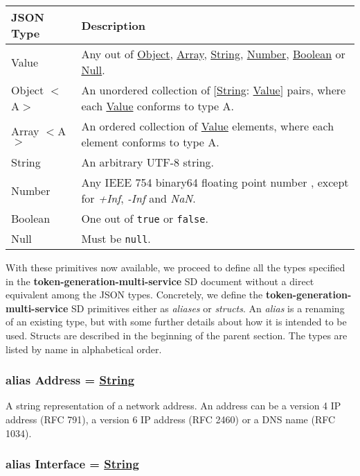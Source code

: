 \documentclass[a4paper]{arrowhead}
\newcommand{\pdef}[1]{{\textcolor{ArrowheadGrey}{#1 \label{sec:model:primitives:#1} \label{sec:model:primitives:#1s}}}}
\newcommand{\pref}[1]{{\textcolor{ArrowheadGrey}{\hyperref[sec:model:primitives:#1]{#1}}}}
\begin{document}
\clearpage

\begin{table}[ht!]
\begin{tabularx}{\textwidth}{| p{3cm} | X |} \hline
\rowcolor{gray!33} JSON Type & Description \\ \hline
\pdef{Value}                 & Any out of \pref{Object}, \pref{Array}, \pref{String}, \pref{Number}, \pref{Boolean} or \pref{Null}. \\ \hline
\pdef{Object}$<$A$>$         & An unordered collection of $[$\pref{String}: \pref{Value}$]$ pairs, where each \pref{Value} conforms to type A. \\ \hline
\pdef{Array}$<$A$>$          & An ordered collection of \pref{Value} elements, where each element conforms to type A. \\ \hline
\pdef{String}                & An arbitrary UTF-8 string. \\ \hline
\pdef{Number}                & Any IEEE 754 binary64 floating point number \cite{cowlishaw2019floating}, except for \textit{+Inf}, \textit{-Inf} and \textit{NaN}. \\ \hline
\pdef{Boolean}               & One out of \texttt{true} or \texttt{false}. \\ \hline
\pdef{Null}                  & Must be \texttt{null}. \\ \hline
\end{tabularx}
\end{table}

With these primitives now available, we proceed to define all the types specified in the \textbf{token-generation-multi-service} SD document without a direct equivalent among the JSON types.
Concretely, we define the \textbf{token-generation-multi-service} SD primitives either as \textit{aliases} or \textit{structs}.
An \textit{alias} is a renaming of an existing type, but with some further details about how it is intended to be used.
Structs are described in the beginning of the parent section.
The types are listed by name in alphabetical order.

\subsubsection{alias \pdef{Address} = \pref{String}}

A string representation of a network address. An address can be a version 4 IP address (RFC 791), a version 6 IP address (RFC 2460) or a DNS name (RFC 1034).

\subsubsection{alias \pdef{Interface} = \pref{String}}
\end{document}
